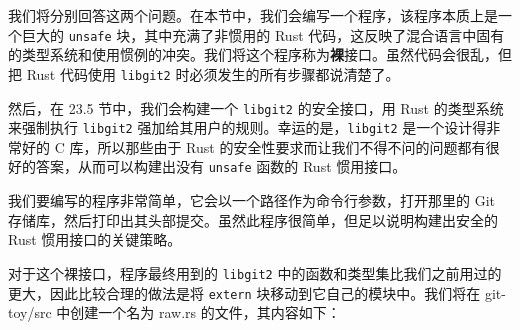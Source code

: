 我们将分别回答这两个问题。在本节中，我们会编写一个程序，该程序本质上是一个巨大的 \texttt{unsafe} 块，其中充满了非惯用的 Rust 代码，这反映了混合语言中固有的类型系统和使用惯例的冲突。我们将这个程序称为\textbf{裸}接口。虽然代码会很乱，但把 Rust 代码使用 \texttt{libgit2} 时必须发生的所有步骤都说清楚了。

然后，在 23.5 节中，我们会构建一个 \texttt{libgit2} 的安全接口，用 Rust 的类型系统来强制执行 \texttt{libgit2} 强加给其用户的规则。幸运的是，\texttt{libgit2} 是一个设计得非常好的 C 库，所以那些由于 Rust 的安全性要求而让我们不得不问的问题都有很好的答案，从而可以构建出没有 \texttt{unsafe} 函数的 Rust 惯用接口。

我们要编写的程序非常简单，它会以一个路径作为命令行参数，打开那里的 Git 存储库，然后打印出其头部提交。虽然此程序很简单，但足以说明构建出安全的 Rust 惯用接口的关键策略。

对于这个裸接口，程序最终用到的 \texttt{libgit2} 中的函数和类型集比我们之前用过的更大，因此比较合理的做法是将 \texttt{extern} 块移动到它自己的模块中。我们将在 git-toy/\allowbreak{}src 中创建一个名为 raw.rs 的文件，其内容如下：

